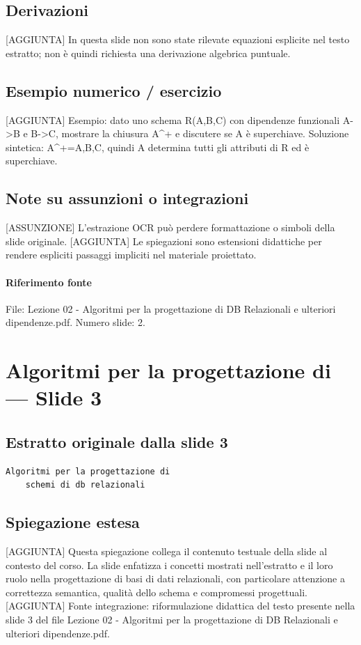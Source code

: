 \documentclass[11pt]{article}
\begin{document}
\subsection*{Derivazioni}
[AGGIUNTA] In questa slide non sono state rilevate equazioni esplicite nel testo estratto; non è quindi richiesta una derivazione algebrica puntuale.
\subsection*{Esempio numerico / esercizio}
[AGGIUNTA] Esempio: dato uno schema R(A,B,C) con dipendenze funzionali A->B e B->C, mostrare la chiusura A^+ e discutere se A è superchiave. Soluzione sintetica: A^+={A,B,C}, quindi A determina tutti gli attributi di R ed è superchiave.
\subsection*{Note su assunzioni o integrazioni}
[ASSUNZIONE] L'estrazione OCR può perdere formattazione o simboli della slide originale.
[AGGIUNTA] Le spiegazioni sono estensioni didattiche per rendere espliciti passaggi impliciti nel materiale proiettato.
\paragraph{Riferimento fonte} File: Lezione 02 - Algoritmi per la progettazione di DB Relazionali e ulteriori dipendenze.pdf. Numero slide: 2.
\section{Algoritmi per la progettazione di --- Slide 3}
\subsection*{Estratto originale dalla slide 3}
\begin{lstlisting}
Algoritmi per la progettazione di
    schemi di db relazionali
\end{lstlisting}
\subsection*{Spiegazione estesa}
[AGGIUNTA] Questa spiegazione collega il contenuto testuale della slide al contesto del corso. La slide enfatizza i concetti mostrati nell'estratto e il loro ruolo nella progettazione di basi di dati relazionali, con particolare attenzione a correttezza semantica, qualità dello schema e compromessi progettuali.
[AGGIUNTA] Fonte integrazione: riformulazione didattica del testo presente nella slide 3 del file Lezione 02 - Algoritmi per la progettazione di DB Relazionali e ulteriori dipendenze.pdf.
\end{document}

